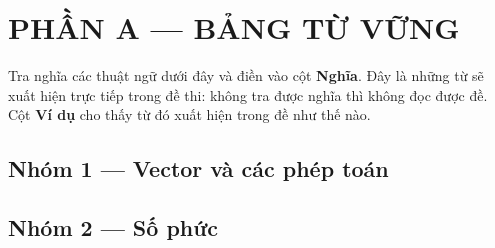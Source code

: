 \documentclass[11pt, a4paper]{article}
\begin{document}

\section{PHẦN A — BẢNG TỪ VỮNG}

Tra nghĩa các thuật ngữ dưới đây và điền vào cột \textbf{Nghĩa}. Đây là những từ sẽ xuất hiện trực tiếp trong đề thi: không tra được nghĩa thì không đọc được đề. Cột \textbf{Ví dụ} cho thấy từ đó xuất hiện trong đề như thế nào.

\subsection{Nhóm 1 — Vector và các phép toán}


\subsection{Nhóm 2 — Số phức}
\end{document}
